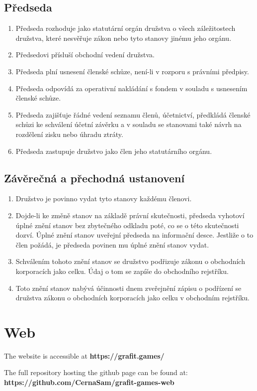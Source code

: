 \section{Předseda}
\begin{enumerate}
    \item Předseda rozhoduje jako statutární orgán družstva o všech záležitostech družstva, které nesvěřuje zákon nebo tyto stanovy jinému jeho orgánu.
    \item Předsedovi přísluší obchodní vedení družstva.
    \item Předseda plní usnesení členské schůze, není-li v rozporu s právními předpisy.
    \item Předseda odpovídá za operativní nakládání s fondem v souladu s usnesením členské schůze.
    \item Předseda zajišťuje řádné vedení seznamu členů, účetnictví, předkládá členské schůzi ke schválení účetní závěrku a v souladu se stanovami také návrh na rozdělení zisku nebo úhradu ztráty.
    \item Předseda zastupuje družstvo jako člen jeho statutárního orgánu.
\end{enumerate}

\section{Závěrečná a přechodná ustanovení}
\begin{enumerate}
    \item Družstvo je povinno vydat tyto stanovy každému členovi.
    \item Dojde-li ke změně stanov na základě právní skutečnosti, předseda vyhotoví úplné znění stanov bez zbytečného odkladu poté, co se o této skutečnosti dozví. Úplné znění stanov uveřejní předseda na informační desce. Jestliže o to člen požádá, je předseda povinen mu úplné znění stanov vydat.
    \item Schválením tohoto znění stanov se družstvo podřizuje zákonu o obchodních korporacích jako celku. Údaj o tom se zapíše do obchodního rejstříku.
    \item Toto znění stanov nabývá účinnosti dnem zveřejnění zápisu o podřízení se družstva zákonu o obchodních korporacích jako celku v obchodním rejstříku.
\end{enumerate}

\chapter{Web}
The website is accessible at \textbf{https://grafit.games/}

The full repository hosting the github page can be found at: \textbf{https://github.com/CernaSam/grafit-games-web}
